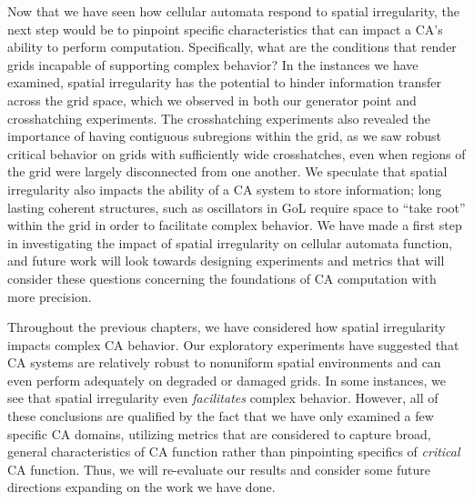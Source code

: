 \documentclass[a4paper,11pt]{article}
\begin{document}
Now that we have seen how cellular automata respond to spatial irregularity, the next step would be to pinpoint specific characteristics that can impact a CA's ability to perform computation. Specifically, what are the conditions that render grids incapable of supporting complex behavior? In the instances we have examined, spatial irregularity has the potential to hinder information transfer across the grid space, which we observed in both our generator point and crosshatching experiments. The crosshatching experiments also revealed the importance of having contiguous subregions within the grid, as we saw robust critical behavior on grids with sufficiently wide crosshatches, even when regions of the grid were largely disconnected from one another. We speculate that spatial irregularity also impacts the ability of a CA system to store information; long lasting coherent structures, such as oscillators in GoL require space to ``take root'' within the grid in order to facilitate complex behavior. We have made a first step in investigating the impact of spatial irregularity on cellular automata function, and future work will look towards designing experiments and metrics that will consider these questions concerning the foundations of CA computation with more precision. 



Throughout the previous chapters, we have considered how spatial irregularity impacts complex CA behavior. Our exploratory experiments have suggested that CA systems are relatively robust to nonuniform spatial environments and can even perform adequately on degraded or damaged grids. In some instances, we see that spatial irregularity even \textit{facilitates} complex behavior. However, all of these conclusions are qualified by the fact that we have only examined a few specific CA domains, utilizing metrics that are considered to capture broad, general characteristics of CA function rather than pinpointing specifics of \textit{critical} CA function. Thus, we will re-evaluate our results and consider some future directions expanding on the work we have done.

\end{document}

